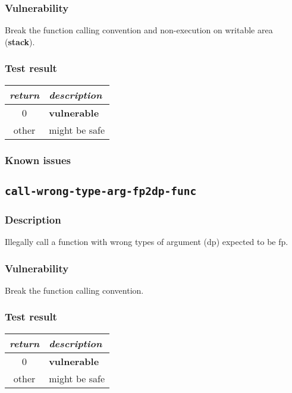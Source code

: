 \documentclass[a4paper]{book}
\begin{document}
\subsubsection{Vulnerability}
Break the function calling convention and non-execution on writable area (\textbf{stack}).

\subsubsection{Test result}
\begin{tabular}{cl}
  \toprule
  \emph{return}  & \emph{description} \\
  \midrule
  0              & \textbf{vulnerable} \\
  other          & might be safe \\
  \bottomrule
\end{tabular}

\subsubsection{Known issues}


\newpage

\subsection{\texttt{call-wrong-type-arg-fp2dp-func}}\label{test-call-wrong-type-arg-fp2dp-func}

\subsubsection{Description}
Illegally call a function with wrong types of argument (dp)  expected to be fp.

\subsubsection{Vulnerability}
Break the function calling convention.

\subsubsection{Test result}
\begin{tabular}{cl}
  \toprule
  \emph{return}  & \emph{description} \\
  \midrule
  0              & \textbf{vulnerable} \\
  other          & might be safe \\
  \bottomrule
\end{tabular}
\end{document}
